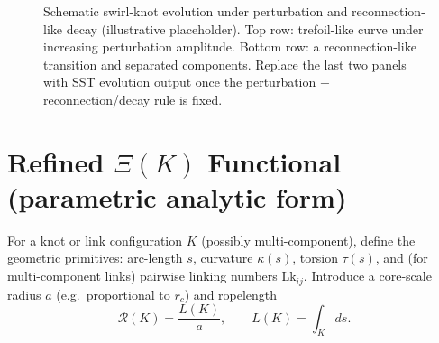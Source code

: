 \documentclass[10pt]{article}
\begin{document}
\begin{figure}[h]

    \caption{Schematic swirl-knot evolution under perturbation and reconnection-like decay (illustrative placeholder). Top row: trefoil-like curve under increasing perturbation amplitude. Bottom row: a reconnection-like transition and separated components. Replace the last two panels with SST evolution output once the perturbation + reconnection/decay rule is fixed.}
    \label{fig:knot-evolution-panel}
    \end{figure}



\section{Refined $\Xi(K)$ Functional (parametric analytic form)}
\label{sec:v076-xi}

For a knot or link configuration $K$ (possibly multi-component), define the geometric primitives:
arc-length $s$, curvature $\kappa(s)$, torsion $\tau(s)$, and (for multi-component links) pairwise
linking numbers $\mathrm{Lk}_{ij}$. Introduce a core-scale radius $a$ (e.g.\ proportional to $r_c$)
and ropelength
\begin{equation}
\mathcal{R}(K)=\frac{L(K)}{a},
\qquad
L(K)=\int_K ds.
\end{equation}
\end{document}

